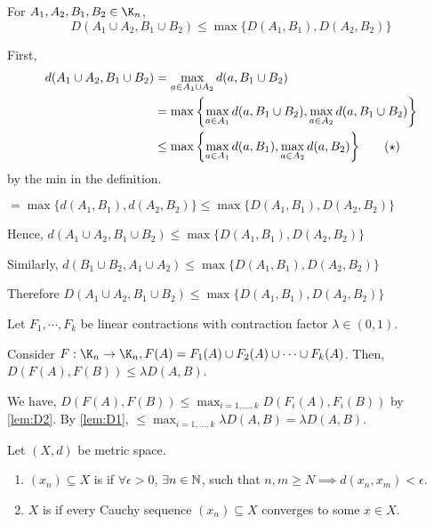 \documentclass[class=pmath370,tikz,notes]{agony}
\begin{document}
\begin{lemma}\label{lem:D2}
  For $A_1, A_2, B_1, B_2 \in \K_n$,
  \[ D(A_1 \cup A_2, B_1 \cup B_2) \leq \max\{D(A_1, B_1), D(A_2, B_2)\} \]
\end{lemma}
\begin{prf}
  First,
  \begin{align*}
    d(A_1 \cup A_2, B_1 \cup B_2)
     & = \max_{a \in A_1 \cup A_2} d(a, B_1 \cup B_2)                                       \\
     & = \max\qty{\max_{a \in A_1} d(a, B_1 \cup B_2), \max_{a \in A_2} d(a, B_1 \cup B_2)} \\
     & \leq \max\qty{\max_{a \in A_1} d(a, B_1), \max_{a \in A_2} d(a, B_2)} \tag{$\star$}
  \end{align*}
  by the min in the definition.

  $= \max\{d(A_1, B_1), d(A_2, B_2)\} \leq \max\{D(A_1, B_1), D(A_2, B_2)\}$

  Hence, $d(A_1 \cup A_2, B_1 \cup B_2) \leq \max\{D(A_1, B_1), D(A_2, B_2)\}$

  Similarly, $d(B_1 \cup B_2, A_1 \cup A_2) \leq \max\{D(A_1, B_1), D(A_2, B_2)\}$

  Therefore $D(A_1 \cup A_2, B_1 \cup B_2) \leq \max\{D(A_1, B_1), D(A_2, B_2)\}$
\end{prf}

\begin{lemma}\label{lem:D3}
  Let $F_1, \cdots, F_k$ be linear contractions with contraction factor $\lambda \in (0,1)$.

  Consider $F: \K_n \to \K_n, F(A) = F_1(A) \cup F_2(A) \cup \cdots \cup F_k(A)$.
  Then, $D(F(A), F(B)) \leq \lambda D(A, B)$.
\end{lemma}
\begin{prf}
  We have, $D(F(A), F(B)) \leq \max_{i = 1,\dotsc,k} D(F_i(A), F_i(B))$ by \cref{lem:D2}.
  By \cref{lem:D1}, $\leq \max_{i = 1,\dotsc,k} \lambda D(A, B) = \lambda D(A, B)$.
\end{prf}

\begin{defn}
  Let $(X, d)$ be metric space.
  \begin{enumerate}[nosep]
    \item $(x_n) \subseteq X$ is  if
          $\forall \epsilon > 0$, $\exists n \in \mathbb{N}$, such that
          $n, m \geq N \implies d(x_n, x_m) < \epsilon$.
    \item $X$ is  if every Cauchy sequence $(x_n) \subseteq X$
          converges to some $x \in X$.
  \end{enumerate}
\end{defn}
\end{document}
